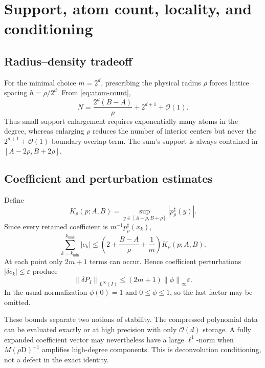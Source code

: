 \documentclass[11pt,oneside]{article}
\theoremstyle{definition}
\theoremstyle{remark}
\newcommand{\D}{\mathrm D}
\newcommand{\bigO}{\mathcal O}
\newcommand{\abs}[1]{\left|#1\right|}
\newcommand{\norm}[1]{\left\lVert#1\right\rVert}
\begin{document}
\section{Support, atom count, locality, and conditioning}
\label{sec:complexity}

\subsection{Radius--density tradeoff}

For the minimal choice \(m=2^d\), prescribing the physical radius \(\rho\)
forces lattice spacing \(h=\rho/2^d\).  From \eqref{eq:atom-count},
\begin{equation}
 N=\frac{2^d(B-A)}{\rho}+2^{d+1}+\bigO(1).
 \label{eq:atom-asymptotic}
\end{equation}
Thus small support enlargement requires exponentially many atoms in the
degree, whereas enlarging \(\rho\) reduces the number of interior centers but
never the \(2^{d+1}+\bigO(1)\) boundary-overlap term.  The sum's support is
always contained in \([A-2\rho,B+2\rho]\).

\subsection{Coefficient and perturbation estimates}

Define
\[
 K_\rho(p;A,B)=
 \sup_{y\in[A-\rho,B+\rho]}\abs{p_\rho^\sharp(y)}.
\]
Since every retained coefficient is \(m^{-1}p_\rho^\sharp(x_k)\),
\begin{equation}
 \sum_{k=k_{\min}}^{k_{\max}}\abs{c_k}
 \le
 \left(2+\frac{B-A}{\rho}+\frac1m\right)K_\rho(p;A,B).
 \label{eq:l1-bound}
\end{equation}
At each point only \(2m+1\) terms can occur.  Hence coefficient perturbations
\(\abs{\delta c_k}\le\varepsilon\) produce
\begin{equation}
 \norm{\delta P_I}_{L^\infty(I)}
 \le (2m+1)\norm{\phi}_\infty\varepsilon.
 \label{eq:perturbation-bound}
\end{equation}
In the usual normalization \(\phi(0)=1\) and \(0\le\phi\le1\), so the last
factor may be omitted.

These bounds separate two notions of stability.  The compressed polynomial
data can be evaluated exactly or at high precision with only
\(\bigO(d)\) storage.  A fully expanded coefficient vector may nevertheless
have a large \(\ell^1\)-norm when \(M(\rho\D)^{-1}\) amplifies high-degree
components.  This is deconvolution conditioning, not a defect in the exact
identity.
\end{document}
